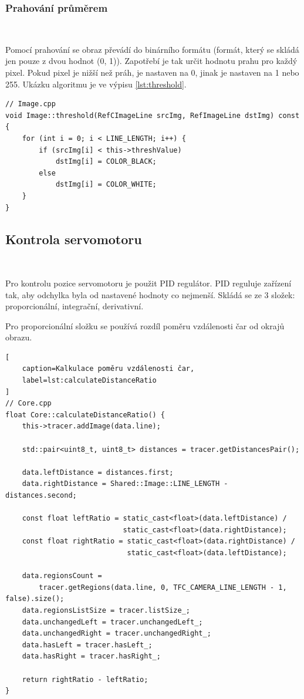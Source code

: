\subsubsection*{Prahování průměrem}\

Pomocí prahování se obraz převádí do binárního formátu (formát, 
který se skládá jen pouze z dvou hodnot (0, 1)).
Zapotřebí je tak určit hodnotu prahu pro každý pixel.
Pokud pixel je nižší než práh, je nastaven na 0, jinak je nastaven na 1 nebo 255.
Ukázku algoritmu je ve výpisu \ref{lst:threshold}\cite{robot}.
\begin{lstlisting}[caption=Prahování průměrem, label=lst:threshold]
// Image.cpp
void Image::threshold(RefCImageLine srcImg, RefImageLine dstImg) const {
    for (int i = 0; i < LINE_LENGTH; i++) {
        if (srcImg[i] < this->threshValue)
            dstImg[i] = COLOR_BLACK;
        else
            dstImg[i] = COLOR_WHITE;
    }
}
\end{lstlisting}

\subsection{Kontrola servomotoru}\

Pro kontrolu pozice servomotoru je použit PID regulátor. PID reguluje zařízení tak, aby odchylka byla od nastavené hodnoty co nejmenší. Skládá se ze 3 složek: proporcionální, integrační, derivativní\cite{PID}.

Pro proporcionální složku se používá rozdíl poměru vzdálenosti čar od okrajů obrazu.
\begin{lstlisting}[
	caption=Kalkulace poměru vzdálenosti čar,
	label=lst:calculateDistanceRatio
]
// Core.cpp
float Core::calculateDistanceRatio() {
    this->tracer.addImage(data.line);

    std::pair<uint8_t, uint8_t> distances = tracer.getDistancesPair();

    data.leftDistance = distances.first;
    data.rightDistance = Shared::Image::LINE_LENGTH - distances.second;

    const float leftRatio = static_cast<float>(data.leftDistance) /
                            static_cast<float>(data.rightDistance);
    const float rightRatio = static_cast<float>(data.rightDistance) /
                             static_cast<float>(data.leftDistance);

    data.regionsCount =
        tracer.getRegions(data.line, 0, TFC_CAMERA_LINE_LENGTH - 1, false).size();
    data.regionsListSize = tracer.listSize_;
    data.unchangedLeft = tracer.unchangedLeft_;
    data.unchangedRight = tracer.unchangedRight_;
    data.hasLeft = tracer.hasLeft_;
    data.hasRight = tracer.hasRight_;

    return rightRatio - leftRatio;
}
\end{lstlisting}


